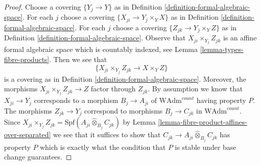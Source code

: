 \documentclass{stacks-project}
\theoremstyle{plain}
\theoremstyle{definition}
\theoremstyle{remark}
\numberwithin{equation}{subsection}
\begin{document}
\begin{proof}
Choose a covering $\{Y_j \to Y\}$ as in
Definition \ref{definition-formal-algebraic-space}.
For each $j$ choose a covering $\{X_{ji} \to Y_j \times_Y X\}$
as in Definition \ref{definition-formal-algebraic-space}.
For each $j$ choose a covering $\{Z_{jk} \to Y_j \times_Y Z\}$
as in Definition \ref{definition-formal-algebraic-space}.
Observe that $X_{ji} \times_{Y_j} Z_{jk}$ is an
affine formal algebraic space which is countably indexed, see
Lemma \ref{lemma-types-fibre-products}.
Then we see that
$$
\{X_{ji} \times_{Y_j} Z_{jk} \to X \times_Y Z\}
$$
is a covering as in Definition \ref{definition-formal-algebraic-space}.
Moreover, the morphisms $X_{ji} \times_{Y_j} Z_{jk} \to Z$
factor through $Z_{jk}$. By assumption we know that
$X_{ji} \to Y_j$ corresponds to a morphism $B_j \to A_{ji}$ of
$\text{WAdm}^{count}$ having property $P$.
The morphisms $Z_{jk} \to Y_j$ correspond to morphisms $B_j \to C_{jk}$ in
$\text{WAdm}^{count}$. Since
$X_{ji} \times_{Y_j} Z_{jk} =
\text{Spf}(A_{ji} \widehat{\otimes}_{B_j} C_{jk})$
by Lemma \ref{lemma-fibre-product-affines-over-separated}
we see that it suffices to show that
$C_{jk} \to A_{ji} \widehat{\otimes}_{B_j} C_{jk}$
has property $P$ which is exactly what
the condition that $P$ is stable under base change guarantees.
\end{proof}
\end{document}
